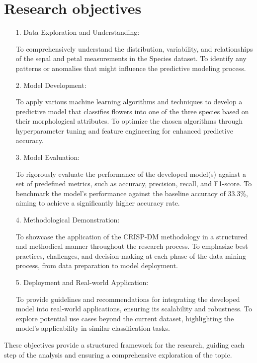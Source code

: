 \documentclass{article}
\begin{document}
\section{Research objectives}
\begin{itemize}
    \item[1.] Data Exploration and Understanding:


    To comprehensively understand the distribution, variability, and relationships of the sepal and petal measurements in the Species dataset.
To identify any patterns or anomalies that might influence the predictive modeling process.
    \item[2.] Model Development:
    
    To apply various machine learning algorithms and techniques to develop a predictive model that classifies flowers into one of the three species based on their morphological attributes.
To optimize the chosen algorithms through hyperparameter tuning and feature engineering for enhanced predictive accuracy.
    \item[3.] Model Evaluation:
    
    To rigorously evaluate the performance of the developed model(s) against a set of predefined metrics, such as accuracy, precision, recall, and F1-score.
To benchmark the model's performance against the baseline accuracy of 33.3\%, aiming to achieve a significantly higher accuracy rate.
    \item[4.]Methodological Demonstration:
    
    To showcase the application of the CRISP-DM methodology in a structured and methodical manner throughout the research process.
To emphasize best practices, challenges, and decision-making at each phase of the data mining process, from data preparation to model deployment.
    \item[5.]Deployment and Real-world Application:
    
    To provide guidelines and recommendations for integrating the developed model into real-world applications, ensuring its scalability and robustness.
To explore potential use cases beyond the current dataset, highlighting the model's applicability in similar classification tasks.
\end{itemize}

These objectives provide a structured framework for the research, guiding each step of the analysis and ensuring a comprehensive exploration of the topic.
\end{document}
